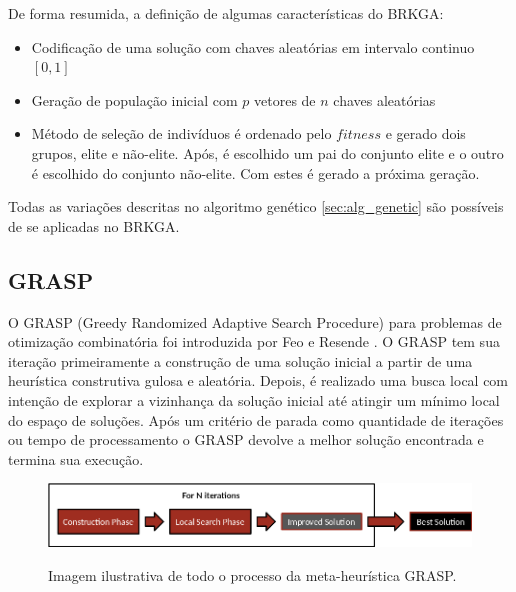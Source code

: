 \documentclass[conference]{IEEEtran}
\begin{document}
    De forma resumida, a definição de algumas características do BRKGA: 


        \begin{itemize}

        \item Codificação de uma solução com chaves aleatórias em intervalo continuo $[0,1]$ 

        \item Geração de população inicial com $p$ vetores de $n$ chaves aleatórias

        \item Método de seleção de indivíduos é ordenado pelo $fitness$ e gerado dois grupos, elite e não-elite. Após, é escolhido um pai do conjunto elite e o outro é escolhido do conjunto
            não-elite. Com estes é gerado a próxima geração. 

        \end{itemize}

        Todas as variações descritas no algoritmo genético \ref{sec:alg_genetic} são possíveis de se aplicadas no BRKGA. 

\subsection{GRASP}
\label{sec:grasp}

    O GRASP (Greedy Randomized Adaptive Search Procedure) para problemas de otimização combinatória foi introduzida por Feo e Resende \cite{feo1989probabilistic}. O GRASP tem sua iteração
    primeiramente a construção de uma solução inicial a partir de uma heurística construtiva gulosa e aleatória. Depois, é realizado uma busca local com intenção de explorar a vizinhança da
    solução inicial até atingir um mínimo local do espaço de soluções. Após um critério de parada como quantidade de iterações ou tempo de processamento o GRASP devolve a melhor solução
    encontrada e termina sua execução.


    \begin{figure}[!htb]
  \centering
 
  \includegraphics[scale=0.35]{imagens/grasp.png}
  \label{figura_grasp}
 \caption{Imagem ilustrativa de todo o processo da meta-heurística GRASP. \cite{fraser2013whole}}
\end{figure}
\end{document}
